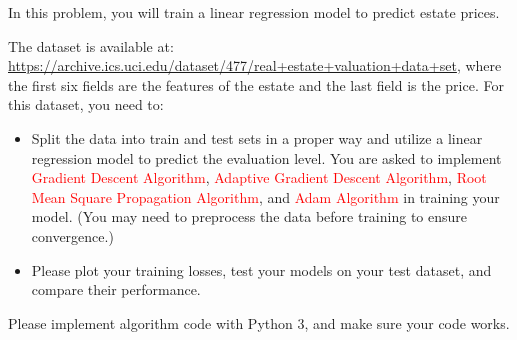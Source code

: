 \documentclass[11pt,oneside,a4paper]{article}
\newcommand{\red}[1]{\textcolor{red}{#1}}
\begin{document}
\noindent In this problem, you will train a linear regression model to predict estate prices.
\vspace{0.1cm}

\noindent The dataset is available at: \url{https://archive.ics.uci.edu/dataset/477/real+estate+valuation+data+set}, where the first six fields are the features of the estate and the last field is the price. For this dataset, you need to:
\begin{itemize}
    \item Split the data into train and test sets in a proper way and utilize a linear regression model to predict the evaluation level. You are asked to implement \red{Gradient Descent Algorithm}, \red{Adaptive Gradient Descent Algorithm}, \red{Root Mean Square Propagation Algorithm}, and \red{Adam Algorithm} in training your model. (You may need to preprocess the data before training to ensure convergence.)
    \item Please plot your training losses, test your models on your test dataset, and compare their performance.
\end{itemize}
\noindent Please implement algorithm code with Python $3$, and make sure your code works.
\end{document}

